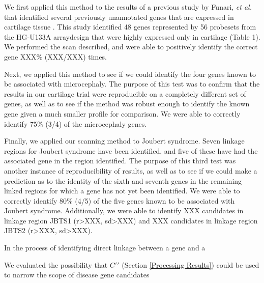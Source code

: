 \documentclass{article}
\begin{document}
We first applied this method to the results of a previous study by Funari,
\emph{et al.} that identified several previously unannotated genes that are
expressed in cartilage tissue \cite{funari}.  This study identified 48 genes
represented by 56 probesets from the HG-U133A arraydesign that were highly
expressed only in cartilage (Table 1).  We performed the scan described, and
were able to positively identify the correct gene XXX\% (XXX/XXX) times.

Next, we applied this method to see if we could identify the four genes known to
be associated with microcephaly.  The purpose of this test was to confirm that
the results in our cartilage trial were reproducible on a completely different
set of genes, as well as to see if the method was robust enough to identify the
known gene given a much smaller profile for comparison.  We were able to
correctly identify 75\% (3/4) of the microcephaly genes.

Finally, we applied our scanning method to Joubert syndrome.  Seven linkage
regions for Joubert syndrome have been identified, and five of these have had
the associated gene in the region identified.  The purpose of this third test
was another instance of reproducibility of results, as well as to see if we
could make a prediction as to the identity of the sixth and seventh genes in
the remaining linked regions for which a gene has not yet been identified.  We
were able to correctly identify 80\% (4/5) of the five genes known to be
associated with Joubert syndrome.  Additionally, we were able to identify XXX
candidates in linkage region JBTS1 (r>XXX, sd>XXX) and XXX candidates in
linkage region JBTS2 (r>XXX, sd>XXX).



In the process of identifying direct linkage between a gene and a 


We evaluated the possibility that $C\prime\prime$ (Section \ref{Processing
Results}) could be used to narrow the scope of disease gene candidates
\end{document}
